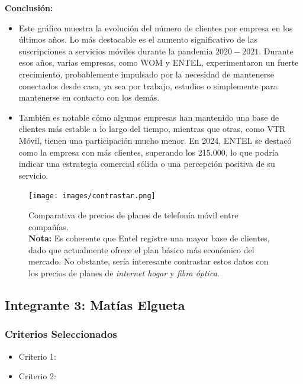 \documentclass[12pt, a4paper]{article}
\begin{document}
\textbf{Conclusión:}  
\begin{itemize}
    \item Este gráfico muestra la evolución del número de clientes por empresa en los últimos años. Lo más destacable es el aumento significativo de las suscripciones a servicios móviles durante la pandemia \(2020-2021\).
    Durante esos años, varias empresas, como WOM y ENTEL, experimentaron un fuerte crecimiento, probablemente impulsado por la necesidad de mantenerse conectados desde casa, ya sea por trabajo, estudios o simplemente para mantenerse en contacto con los demás.
    \item También es notable cómo algunas empresas han mantenido una base de clientes más estable a lo largo del tiempo, mientras que otras, como VTR Móvil, tienen una participación mucho menor. En 2024, ENTEL se destacó como la empresa con más clientes, superando los 215.000, lo que podría indicar una estrategia comercial sólida o una percepción positiva de su servicio.

\end{itemize}

\begin{figure}[H]
    \centering
    \texttt{[image: images/contrastar.png]}
    \caption[Relación precio-plan]{
        Comparativa de precios de planes de telefonía móvil entre compañías. \\
        \textbf{Nota:} Es coherente que Entel registre una mayor base de clientes, dado que actualmente ofrece el plan básico más económico del mercado. No obstante, sería interesante contrastar estos datos con los precios de planes de \textit{internet hogar} y \textit{fibra óptica}.%
    }
    \label{fig:precios_telefonia}
    
   
\end{figure}
\subsection*{Integrante 3: Matías Elgueta}

\subsubsection*{Criterios Seleccionados}
\begin{itemize}
    \item Criterio 1: 
    \item Criterio 2: 
\end{itemize}
\end{document}
